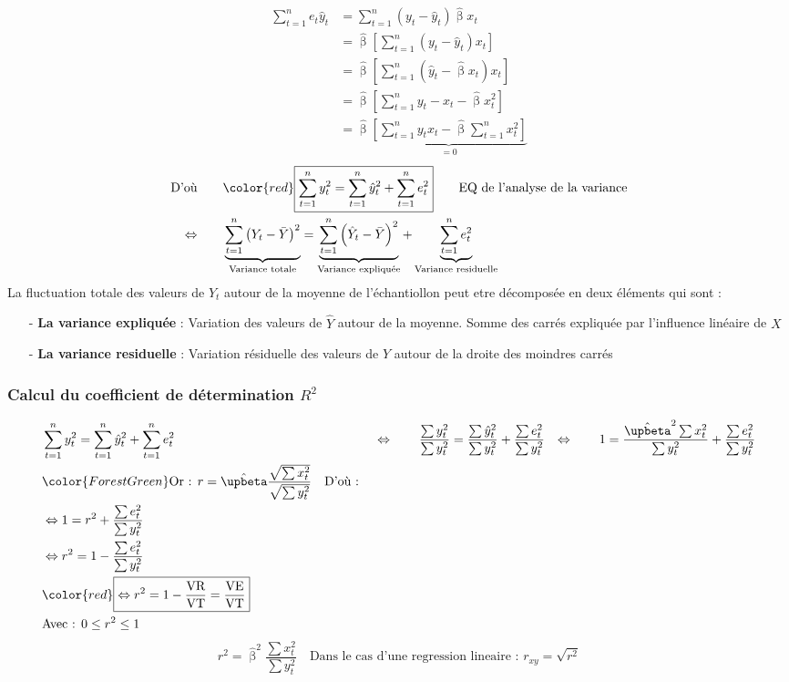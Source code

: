 \documentclass{article}
\newcommand{\hbeta}{\hat{\upbeta}}
\newcommand{\sumt}{\sum\limits_{t=1}^n}
\begin{document}
 \begin{align*}
 	\sumt e_t \hat{y}_t &= \sumt \left(y_t - \hat{y}_t \right) \hbeta x_t  \\
 	&= \hbeta \left[\sumt \left(y_t - \hat{y}_t \right) x_t \right] \\
 	&= \hbeta \left[\sumt \left( \hat{y}_t - \hbeta x_t\right) x_t \right] \\
 	&= \hbeta \left[\sumt y_t - x_t - \hbeta x_t^2 \right] \\
 	&= \hbeta \underbrace{\left[\sumt y_t x_t - \hbeta \sumt x_t^2 \right]}_{= 0}
 \end{align*}
 \begin{align*}
 	\textrm{D'où} \qquad &{\color{red}\boxed{\sumt y_t^2 = \sumt \hat{y}_t^2 + \sumt e_t^2}} \qquad \textrm{EQ de l'analyse de la variance}\\ 	
 	\Leftrightarrow \qquad &\underbrace{\sumt \left(Y_t - \bar{Y} \right)^2}_{\textrm{Variance totale}} = \underbrace{\sumt \left(\hat{Y}_t - \bar{Y}\right)^2}_{\textrm{Variance expliquée}} + \underbrace{\sumt e_t^2}_{\textrm{Variance residuelle}}
 \end{align*}
 La fluctuation totale des valeurs de $Y_t$ autour de la moyenne de l'échantiollon peut etre décomposée en deux éléments qui sont : 
 \begin{itemize}
 	\item[-] \textbf{La variance expliquée} : Variation des valeurs de $\hat{Y}$  autour de la moyenne. Somme des carrés expliquée par l'influence linéaire de $X$
 	\item[-] \textbf{La variance residuelle} : Variation résiduelle des valeurs de $Y$ autour de la droite des moindres carrés
 \end{itemize}
 \subsubsection{Calcul du coefficient de détermination $R^2$}
 \begin{align*}
 	&\sumt y_t^2 = \sumt \hat{y}_t^2 + \sumt e_t^2  &\Leftrightarrow  \qquad \frac{\sum y_t^2}{\sum y_t^2} &= \frac{\sum \hat{y}_t^2}{\sum y_t^2} + \frac{\sum e_t^2}{\sum y_t^2} &\Leftrightarrow \qquad 1 &= \frac{\hbeta^2 \sum x_t^2}{\sum y_t^2} + \frac{\sum e_t^2}{\sum y_t^2} \\
 	&{\color{ForestGreen}\textrm{Or : } r = \hbeta \frac{\sqrt{\sum x_t^2}}{\sqrt{\sum y_t^2}} \quad  \textrm{D'où : }}  \\
 	&\Leftrightarrow  1 = r^2 + \frac{\sum e_t^2}{\sum y_t^2} \\
 	&\Leftrightarrow  r^2 = 1 - \frac{\sum e_t^2}{\sum y_t^2} \\
 	&{\color{red}\boxed{\Leftrightarrow  r^2 = 1 - \frac{\textrm{VR}}{\textrm{VT}} = \frac{\textrm{VE}}{\textrm{VT}}}} \\
 	&\textrm{Avec : }0\leq r^2 \leq 1
 \end{align*}
 \[ r^2 = \hbeta^2 \frac{\sum x_t^2}{\sum y_t^2} \quad \textrm{Dans le cas d'une regression lineaire : } r_{xy} = \sqrt{r^2} 
\]
\end{document}
